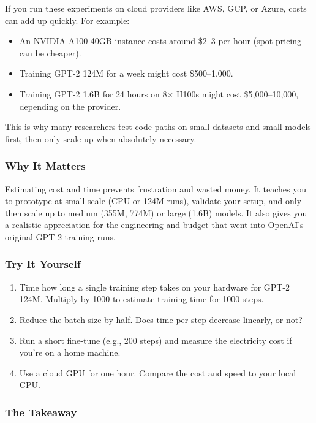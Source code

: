 \documentclass[
  letterpaper,
  DIV=11,
  numbers=noendperiod]{scrreprt}
\providecommand{\tightlist}{%
  \setlength{\itemsep}{0pt}\setlength{\parskip}{0pt}}
\begin{document}
If you run these experiments on cloud providers like AWS, GCP, or Azure,
costs can add up quickly. For example:

\begin{itemize}
\tightlist
\item
  An NVIDIA A100 40GB instance costs around \$2--3 per hour (spot
  pricing can be cheaper).
\item
  Training GPT-2 124M for a week might cost \$500--1,000.
\item
  Training GPT-2 1.6B for 24 hours on 8× H100s might cost
  \$5,000--10,000, depending on the provider.
\end{itemize}

This is why many researchers test code paths on small datasets and small
models first, then only scale up when absolutely necessary.

\subsubsection{Why It Matters}\label{why-it-matters-70}

Estimating cost and time prevents frustration and wasted money. It
teaches you to prototype at small scale (CPU or 124M runs), validate
your setup, and only then scale up to medium (355M, 774M) or large
(1.6B) models. It also gives you a realistic appreciation for the
engineering and budget that went into OpenAI's original GPT-2 training
runs.

\subsubsection{Try It Yourself}\label{try-it-yourself-84}

\begin{enumerate}
\def\labelenumi{\arabic{enumi}.}
\tightlist
\item
  Time how long a single training step takes on your hardware for GPT-2
  124M. Multiply by 1000 to estimate training time for 1000 steps.
\item
  Reduce the batch size by half. Does time per step decrease linearly,
  or not?
\item
  Run a short fine-tune (e.g., 200 steps) and measure the electricity
  cost if you're on a home machine.
\item
  Use a cloud GPU for one hour. Compare the cost and speed to your local
  CPU.
\end{enumerate}

\subsubsection{The Takeaway}\label{the-takeaway-85}
\end{document}
